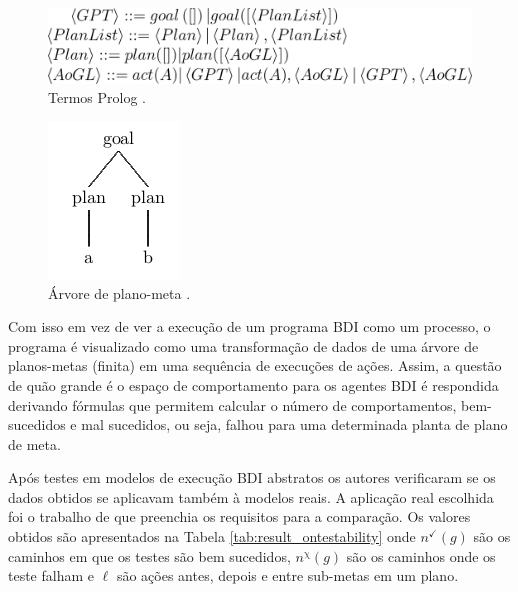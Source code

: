 

\begin{figure}[ht]
\centering
\includegraphics[scale=0.3]{imagens/code.png}
\caption{Termos Prolog \cite{winikoff2014testability}.}
\label{fig:prolog}
\end{figure}

\begin{figure}[ht]
\centering
\includegraphics[scale=0.7]{imagens/simple_tree.png}
\caption{Árvore de plano-meta \cite{winikoff2014testability}.}
\label{fig:arvore}
\end{figure}

Com isso em vez de ver a execução de um programa BDI como um processo, o programa é visualizado como uma transformação de dados de uma árvore de planos-metas (finita) em uma sequência de execuções de ações. Assim, a questão de quão grande é o espaço de comportamento para os agentes BDI é respondida derivando fórmulas que permitem calcular o número de comportamentos, bem-sucedidos e mal sucedidos, ou seja, falhou para uma determinada planta de plano de meta.

Após testes em modelos de execução BDI abstratos os autores verificaram se os dados obtidos se aplicavam também à modelos reais. A aplicação real escolhida foi o trabalho de \cite{burmeister2008bdi} que preenchia os requisitos para a comparação. Os valores obtidos são apresentados na Tabela \ref{tab:result_ontestability} onde $n^{\checkmark}(g)$ são os caminhos em que os testes são bem sucedidos, $n^{\upchi}(g)$ são os caminhos onde os teste falham e $\ell$ são ações antes, depois e entre sub-metas em um plano.

